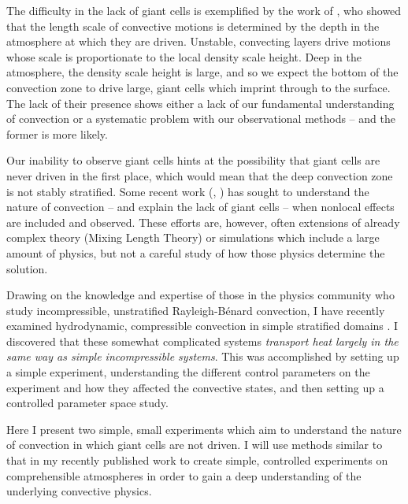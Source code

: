 \documentclass[aasms,12pt]{article}
\newcommand{\RB}{Rayleigh-B\'{e}nard }
\begin{document}
The difficulty in the lack of giant cells is exemplified by the work of \cite{lord&all2014}, who showed that 
the length scale of convective motions is determined by the depth in the atmosphere at which they are driven.
Unstable, convecting layers drive motions whose scale is proportionate to
the local density scale height.  Deep in the atmosphere, the density scale height is large, and so we expect
the bottom of the convection zone to drive large, giant cells which imprint through to the surface.
The lack of their presence shows either a lack of our fundamental understanding of convection or
a systematic problem with our observational methods -- and the former is more likely.

Our inability to observe giant cells hints at the possibility that giant cells are never driven in the first place,
which would mean that the deep convection zone is not stably stratified. Some recent work
(\cite{brandenburg2016}, \cite{kapyla&all2017}) has sought to understand the nature of convection
-- and explain the lack of giant cells -- when nonlocal effects are included and observed.  
These efforts are, however, often extensions of already complex theory (Mixing Length Theory) or
simulations which include a large amount of physics, but not a careful study of how those physics
determine the solution.

Drawing on the knowledge and expertise of those in the physics community who study incompressible,
unstratified \RB convection, I have recently examined hydrodynamic, compressible convection
in simple stratified domains \cite{anders&brown2017}.  I discovered that these somewhat complicated systems
\emph{transport heat largely in the same way as simple incompressible systems}.  
This was accomplished by setting up a simple experiment, understanding the different control parameters
on the experiment and how they affected the convective states, and then setting up a controlled parameter
space study.

Here I present two simple, small experiments which aim to understand the nature of convection
in which giant cells are not driven.  I will use methods similar to that in my recently published work
to create simple, controlled experiments on comprehensible atmospheres in order to gain a deep
understanding of the underlying convective physics.
\end{document}
